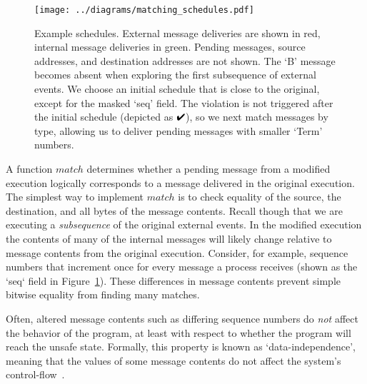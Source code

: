 \begin{figure}[tb!]
    \texttt{[image: ../diagrams/matching\_schedules.pdf]}
    \vspace{-1em}
    \caption[]{\label{fig:matching} Example schedules. External
    message deliveries are shown in red, internal message deliveries in green. Pending
    messages, source addresses, and destination addresses are not shown. The `B' message
    becomes absent when exploring the first subsequence of external
    events. We choose an initial schedule that is close to the original,
    except for the masked `seq' field. The violation is not triggered after
    the initial schedule (depicted as $\PASS$), so we next match messages by type,
    allowing us to deliver pending messages with smaller `Term' numbers.}%
    \vspace{-1.5em}
\end{figure}


 A function $match$ determines whether a
pending message from a modified execution logically corresponds to a
message delivered in the original execution. The simplest way to implement
$match$ is to
check equality of the source, the destination, and all bytes of the message
contents. Recall though that we are executing a
{\em subsequence} of the original external events.
In the modified execution the contents of many of the
internal messages will likely change relative to message contents from the original execution. Consider, for example, sequence numbers
that increment once for every message a process receives (shown as the `seq` field in Figure~\ref{fig:matching}). These differences in
message contents prevent simple bitwise equality from finding
many matches.

 Often, altered message
contents such as differing sequence numbers do {\em not} affect the behavior of the
program, at least with respect to whether the program will reach the
unsafe state. Formally, this property is known as
`data-independence', meaning that the values of some message contents
do not affect the system's control-flow~\cite{shacham2014verifying,wolper}.


